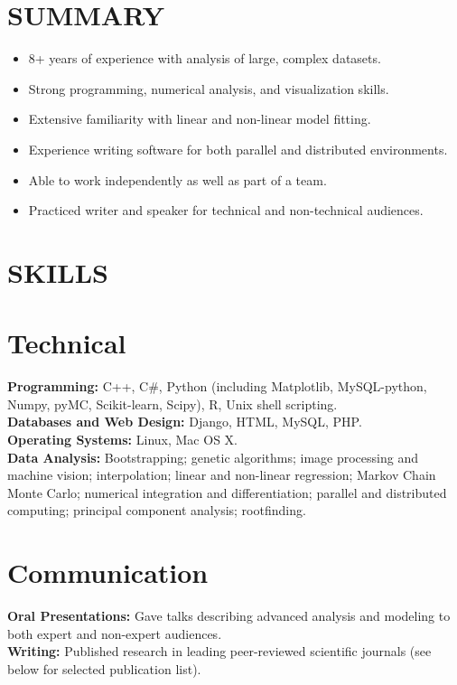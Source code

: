 \documentclass[11pt, margin]{res_hacked_long}
\begin{document}
  

\address{rook166@gmail.com --- (917)-836-4267}
                        
\begin{resume}      
\section{SUMMARY}
\vspace*{0.15 in}\begin{itemize}\itemsep -2pt
\addtolength{\itemindent}{-0.215in}
\item 8+ years of experience with analysis of large, complex datasets.
\item Strong programming, numerical analysis, and visualization skills.
\item Extensive familiarity with linear and non-linear model fitting.
\item Experience writing software for both parallel and distributed
  environments.
\item Able to work independently as well as part of a team.
\item Practiced writer and speaker for technical and non-technical audiences.
\end{itemize}
\vspace {-0.2 in}
\section{SKILLS} 
\normalsize{\section{Technical}}
                    {\bf Programming:} C++, C\#, Python (including
                    Matplotlib, MySQL-python, Numpy, pyMC,
                    Scikit-learn, Scipy), R, Unix shell scripting.\\
                      {\bf Databases and Web Design:} Django, HTML, MySQL, PHP.\\
                        {\bf Operating Systems:} Linux, Mac OS X.\\
                        {\bf Data Analysis:} Bootstrapping; genetic algorithms; image
                        processing and machine vision; interpolation;
                        linear and non-linear regression; Markov Chain
                        Monte Carlo; numerical integration and
                        differentiation; parallel and distributed
                        computing; principal component analysis; rootfinding.
\vspace {-0.2 in}
\normalsize{\section{Communication}}
                     {\bf Oral Presentations:} Gave talks describing advanced
                       analysis and modeling to both expert and
                       non-expert audiences.\\
                       {\bf Writing:} Published research in leading
                         peer-reviewed scientific journals (see below
                         for selected publication list).
\vspace {-0.1 in}

\end{resume}
\end{document}
